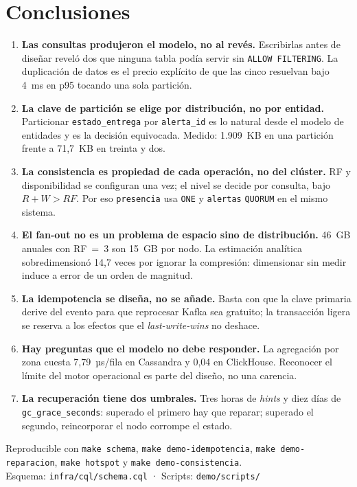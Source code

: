 \documentclass[11pt,a4paper]{article}
\begin{document}
\section{Conclusiones}
\begin{enumerate}[leftmargin=*,itemsep=2pt]
\item \textbf{Las consultas produjeron el modelo, no al revés.} Escribirlas antes de
diseñar reveló dos que ninguna tabla podía servir sin \texttt{ALLOW FILTERING}. La
duplicación de datos es el precio explícito de que las cinco resuelvan bajo 4~ms en
p95 tocando una sola partición.

\item \textbf{La clave de partición se elige por distribución, no por entidad.}
Particionar \texttt{estado\_entrega} por \texttt{alerta\_id} es lo natural desde el
modelo de entidades y es la decisión equivocada. Medido: 1.909~KB en una partición
frente a 71,7~KB en treinta y dos.

\item \textbf{La consistencia es propiedad de cada operación, no del clúster.} RF y
disponibilidad se configuran una vez; el nivel se decide por consulta, bajo
$R+W>RF$. Por eso \texttt{presencia} usa \texttt{ONE} y \texttt{alertas}
\texttt{QUORUM} en el mismo sistema.

\item \textbf{El fan-out no es un problema de espacio sino de distribución.} 46~GB
anuales con RF~=~3 son 15~GB por nodo. La estimación analítica sobredimensionó 14,7
veces por ignorar la compresión: dimensionar sin medir induce a error de un orden de
magnitud.

\item \textbf{La idempotencia se diseña, no se añade.} Basta con que la clave
primaria derive del evento para que reprocesar Kafka sea gratuito; la transacción
ligera se reserva a los efectos que el \emph{last-write-wins} no deshace.

\item \textbf{Hay preguntas que el modelo no debe responder.} La agregación por
zona cuesta 7,79~µs/fila en Cassandra y 0,04 en ClickHouse. Reconocer el límite del
motor operacional es parte del diseño, no una carencia.

\item \textbf{La recuperación tiene dos umbrales.} Tres horas de \emph{hints} y diez
días de \texttt{gc\_grace\_seconds}: superado el primero hay que reparar; superado
el segundo, reincorporar el nodo corrompe el estado.
\end{enumerate}

\vfill
\begin{center}\footnotesize\color{gray}
Reproducible con \texttt{make schema}, \texttt{make demo-idempotencia},
\texttt{make demo-reparacion}, \texttt{make hotspot} y \texttt{make demo-consistencia}.\\
Esquema: \texttt{infra/cql/schema.cql} · Scripts: \texttt{demo/scripts/}
\end{center}
\end{document}
